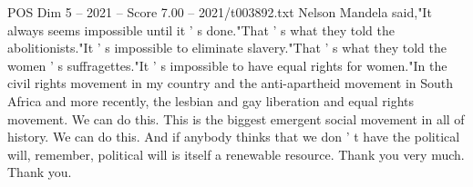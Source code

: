 \begin{textsample}{POS Dim 5 – 2021 – Score 7.00 – 2021/t003892.txt}
Nelson Mandela said,"It always seems impossible until it ' s done."That ' s what they told the abolitionists."It ' s impossible to eliminate slavery."That ' s what they told the women ' s suffragettes."It ' s impossible to have equal rights for women."In the civil rights movement in my country and the anti-apartheid movement in South Africa and more recently, the lesbian and gay liberation and equal rights movement.
We can do this.
This is the biggest emergent social movement in all of history.
We can do this.
And if anybody thinks that we don ' t have the political will, remember, political will is itself a renewable resource.
Thank you very much.
Thank you.

\end{textsample}
